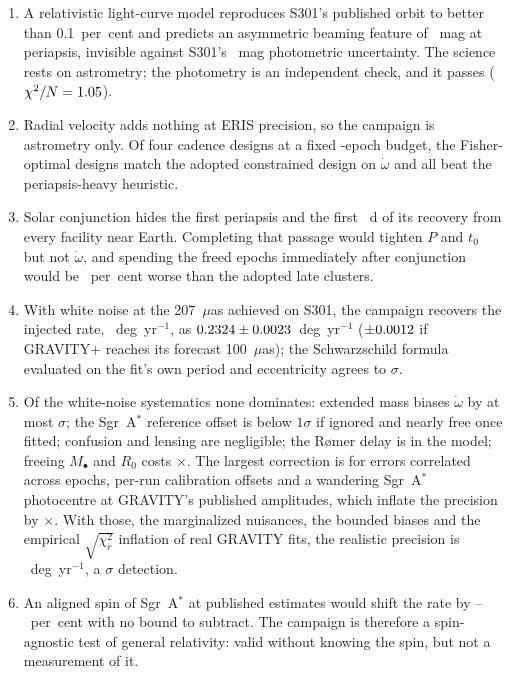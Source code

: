 \documentclass{aastex701}
\begin{document}
\begin{enumerate}
\item A relativistic light-curve model reproduces S301's published orbit to better than 0.1~per~cent and predicts an asymmetric beaming feature of \lightcurveAmplitudeMag{}~mag at periapsis, invisible against S301's \campaignSigmaDmag{}~mag photometric uncertainty. The science rests on astrometry; the photometry is an independent check, and it passes ($\chi^2/N = 1.05{}$).
\item Radial velocity adds nothing at ERIS precision, so the campaign is astrometry only. Of four cadence designs at a fixed \campaignNEpochs{}-epoch budget, the Fisher-optimal designs match the adopted constrained design on $\dot\omega$ and all beat the periapsis-heavy heuristic.
\item Solar conjunction hides the first periapsis and the first \conjunctionGapDaysAfterPeri{}~d of its recovery from every facility near Earth. Completing that passage would tighten $P$ and $t_0$ but not $\dot\omega$, and spending the freed epochs immediately after conjunction would be \cadenceReallocatePctChange{}~per~cent worse than the adopted late clusters.
\item With white noise at the 207~$\mu$as achieved on S301, the campaign recovers the injected rate, \fitTruthOmegaDotDegYr{}~deg~yr$^{-1}$, as $0.2324 \pm 0.0023$~deg~yr$^{-1}$ ($\pm0.0012$ if GRAVITY+ reaches its forecast 100~$\mu$as); the Schwarzschild formula evaluated on the fit's own period and eccentricity agrees to \fitPnDiffNsigma{}$\sigma$.
\item Of the white-noise systematics none dominates: extended mass biases $\dot\omega$ by at most \extmassBiasNsigmaThree{}$\sigma$; the Sgr~A$^*$ reference offset is below $1\sigma$ if ignored and nearly free once fitted; confusion and lensing are negligible; the R{\o}mer delay is in the model; freeing $M_\bullet$ and $R_0$ costs \massdistRatioOmegaDotDegYr{}$\times$. The largest correction is for errors correlated across epochs, per-run calibration offsets and a wandering Sgr~A$^*$ photocentre at GRAVITY's published amplitudes, which inflate the precision by \corrnoiseFidRatioOmegaDot{}$\times$. With those, the marginalized nuisances, the bounded biases and the empirical $\sqrt{\chi^2_r}$ inflation of real GRAVITY fits, the realistic precision is \budgetBottomLineInflated{}~deg~yr$^{-1}$, a \budgetBottomLineInflatedDetectionNsigma{}$\sigma$ detection.
\item An aligned spin of Sgr~A$^*$ at published estimates would shift the rate by \spinLtPctChiNineZero{}--\spinLtPctChiOneZeroZero{}~per~cent with no bound to subtract. The campaign is therefore a spin-agnostic test of general relativity: valid without knowing the spin, but not a measurement of it.
\end{enumerate}
\end{document}
